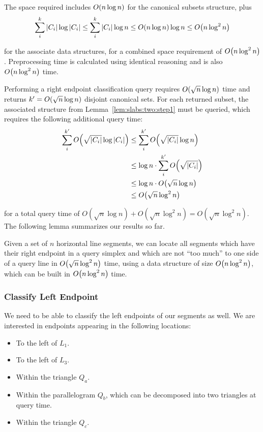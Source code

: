 The space required includes $O\!\left(n \log{n}\right)$ for the canonical subsets structure, plus
\[
\sum_{i}^{k}{|C_i| \log{|C_i|}} 
\leq \sum_{i}^{k}{|C_i| \log{n}} 
\leq O\!\left(n\log{n}\right) \log{n} 
\leq O\!\left(n \log^2{n}\right)
\]

\noindent for the associate data structures, for a combined space requirement of $O\!\left(n\log^2{n}\right)$. Preprocessing time is calculated using identical reasoning and is also $O\!\left(n \log^2{n}\right)$ time.

Performing a right endpoint classification query requires $O\!\left(\sqrt{n}\log{n}\right)$ time and returns $k' = O\!\left(\sqrt{n}\log{n}\right)$ disjoint canonical sets. For each returned subset, the associated structure from Lemma~\ref{lem:slabs:two:step1} must be queried, which requires the following additional query time:
\[
\begin{split}
\sum_{i}^{k'}{\BigOh{\sqrt{|C_i|}\log{|C_i|}}} 
&\leq \sum_{i}^{k'}{\BigOh{\sqrt{|C_i|} \log{n}}} \\
%
&\leq \log{n} \cdot \sum_{i}^{k'}{\BigOh{\sqrt{|C_i|}}} \\
%
&\leq \log{n} \cdot \BigOh{\sqrt{n}\log{n}} \\
%
&\leq \BigOh{\sqrt{n}\log^2{n}} \\
%
\end{split}
\]

\noindent for a total query time of $O(\sqrt{n}\log{n}) + O(\sqrt{n}\log^2{n}) = O(\sqrt{n}\log^2{n})$. The following lemma summarizes our results so far.

\begin{lemma}
\label{lem:slabs:two:step2}
Given a set of $n$ horizontal line segments, we can locate all segments which have their right endpoint in a query simplex and which are not ``too much'' to one side of a query line in $O\!\left(\sqrt{n}\log^2{n}\right)$ time, using a data structure of size $O\!\left(n\log^2{n}\right)$, which can be built in $O\!\left(n\log^2{n}\right)$ time.
\end{lemma}


\subsubsection{Classify Left Endpoint}

We need to be able to classify the left endpoints of our segments as well. We are interested in endpoints appearing in the following locations:

\begin{itemize}
 \item To the left of $L_1$.
 \item To the left of $L_3$.
 \item Within the triangle $Q_a$.
 \item Within the parallelogram $Q_b$, which can be decomposed into two triangles at query time.
 \item Within the triangle $Q_c$.
\end{itemize}

